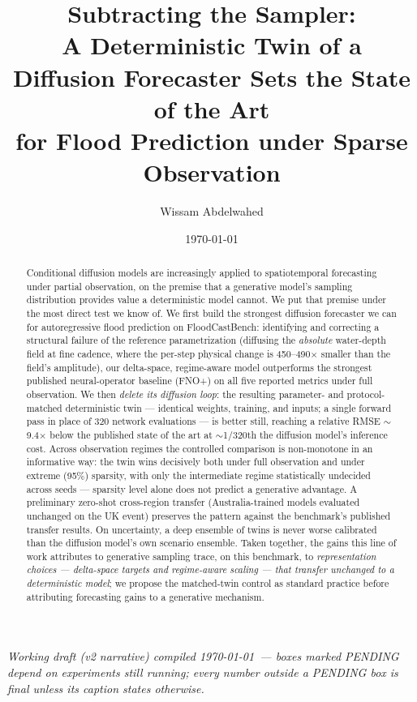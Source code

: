 \documentclass[11pt]{article}
\title{\textbf{Subtracting the Sampler: \\
  \large A Deterministic Twin of a Diffusion Forecaster Sets the State of
  the Art \\ for Flood Prediction under Sparse Observation}}
\author{Wissam Abdelwahed}
\date{\today}
\newcommand{\readynote}[1]{%
  {\small\color{gray}\textit{#1}}
}
\begin{document}
\maketitle

\begin{abstract}
\noindent
Conditional diffusion models are increasingly applied to spatiotemporal
forecasting under partial observation, on the premise that a generative
model's sampling distribution provides value a deterministic model cannot.
We put that premise under the most direct test we know of. We first build
the strongest diffusion forecaster we can for autoregressive flood
prediction on FloodCastBench: identifying and correcting a structural
failure of the reference parametrization (diffusing the \emph{absolute}
water-depth field at fine cadence, where the per-step physical change is
450--490$\times$ smaller than the field's amplitude), our delta-space,
regime-aware model outperforms the strongest published neural-operator
baseline (FNO+) on all five reported metrics under full observation. We
then \emph{delete its diffusion loop}: the resulting parameter- and
protocol-matched deterministic twin --- identical weights, training, and
inputs; a single forward pass in place of 320 network evaluations --- is
better still, reaching a relative RMSE $\sim$9.4$\times$ below the
published state of the art at $\sim$1/320th the diffusion model's
inference cost. Across observation regimes the controlled comparison is
non-monotone in an informative way: the twin wins decisively both under
full observation and under extreme (95\%) sparsity, with only the
intermediate regime statistically undecided across seeds --- sparsity
level alone does not predict a generative advantage. A preliminary
zero-shot cross-region transfer (Australia-trained models evaluated
unchanged on the UK event) preserves the pattern against the benchmark's
published transfer results. On uncertainty, a deep ensemble of twins is
never worse calibrated than the diffusion model's own scenario ensemble.
Taken together, the gains this line of work attributes to generative
sampling trace, on this benchmark, to \emph{representation choices ---
delta-space targets and regime-aware scaling --- that transfer unchanged
to a deterministic model}; we propose the matched-twin control as standard
practice before attributing forecasting gains to a generative mechanism.
\end{abstract}

\begin{center}
\readynote{Working draft (v2 narrative) compiled \today\ --- boxes marked
PENDING depend on experiments still running; every number outside a
PENDING box is final unless its caption states otherwise.}
\end{center}
\end{document}
